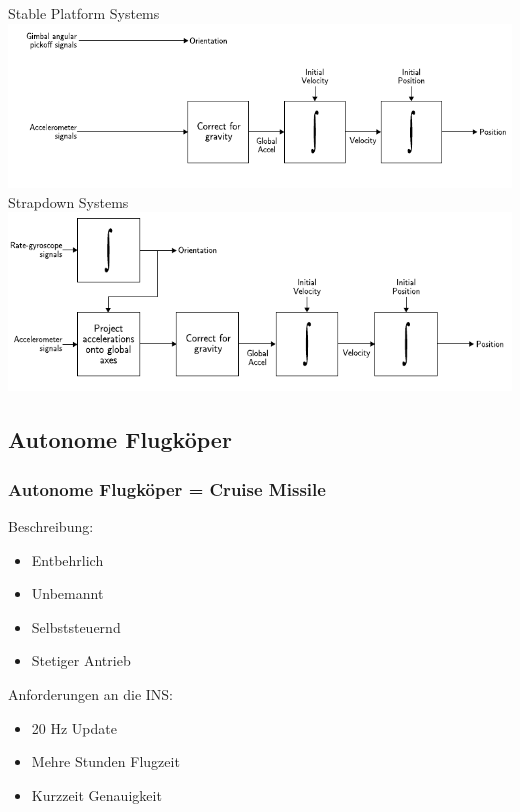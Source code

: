\documentclass[10pt,a4paper,oneside]{beamer}
\begin{document}
\begin{frame}
	Stable Platform Systems
	\resizebox{\textwidth}{0.4\textheight} {
	\includegraphics[scale=1]{images/stable_platform.png} 
	}
	\bigskip
	Strapdown Systems
	\resizebox{\textwidth}{0.4\textheight} {
		\includegraphics[scale=1]{images/strapdown.png} 
	}

\end{frame}

\begin{frame}
	\section{Autonome Flugköper}
	\frametitle{Autonome Flugköper = Cruise Missile}
	Beschreibung: \cite{GS04}
	
	\begin{itemize}
		\item Entbehrlich
		\item Unbemannt
		\item Selbststeuernd
		\item Stetiger Antrieb
	\end{itemize}
	
	Anforderungen an die INS:\\
	\begin{itemize}
		\item 20 Hz Update
		\item Mehre Stunden Flugzeit
		\item Kurzzeit Genauigkeit
	\end{itemize}
	
\end{frame}
\end{document}
